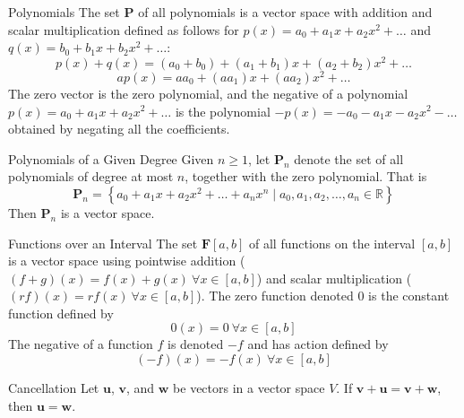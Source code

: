 \documentclass[12pt]{article}
\begin{document}
\begin{definition}{Polynomials}{}
    The set $ \mathbf{P} $ of all polynomials is a vector space with addition and scalar multiplication defined as follows for $ p \left( x \right) = a_0 + a_1 x + a_2 x^2 + \dots $ and $ q \left( x \right) = b_0 + b_1 x + b_2 x^2 + \dots $:
    \[ p \left( x \right) + q \left( x \right) = \left( a_0 + b_0 \right) + \left( a_1 + b_1 \right) x + \left( a_2 + b_2 \right) x^2 + \dots \]
    \[ a p(x) = a a_0 + \left( a a_1 \right) x + \left( a a_2 \right) x^2 + \dots \]
    The zero vector is the zero polynomial, and the negative of a polynomial $ p \left( x \right) = a_0 + a_1 x + a_2 x^2 + \dots $ is the polynomial $ -p \left( x \right) = - a_0 - a_1 x - a_2 x^2 - \dots $ obtained by negating all the coefficients.
\end{definition}

\begin{definition}{Polynomials of a Given Degree}{}
    Given $ n \geq 1 $, let $ \mathbf{P}_n $ denote the set of all polynomials of degree at most $ n $, together with the zero polynomial. That is
    \[ \mathbf{P}_n = \left\{ a_0 + a_1 x + a_2 x^2 + \dots + a_n x^n \mid a_0, a_1, a_2, \dots, a_n \in \mathbb{R} \right\} \]
    Then $ \mathbf{P}_n $ is a vector space.
\end{definition}

\begin{definition}{Functions over an Interval}{}
    The set $ \mathbf{F} \left[ a , b \right] $ of all functions on the interval $ \left[ a, b \right] $ is a vector space using pointwise addition ($ \left( f + g \right) \left( x \right) = f \left( x \right) + g \left( x \right) \ \forall x \in \left[ a, b \right] $) and scalar multiplication ($ \left( rf \right) \left( x \right) = r f \left( x \right) \ \forall x \in \left[ a, b \right] $). The zero function denoted $ 0 $ is the constant function defined by
    \[ 0 \left( x \right) = 0 \ \forall x \in \left[ a, b \right] \]
    The negative of a function $ f $ is denoted $ -f $ and has action defined by
    \[ \left( -f \right) \left( x \right) = - f \left( x \right) \ \forall x \in \left[ a, b \right] \]
\end{definition}

\begin{theorem}{Cancellation}{}
    Let $ \mathbf{u} $, $ \mathbf{v} $, and $ \mathbf{w} $ be vectors in a vector space $ V $. If $ \mathbf{v} + \mathbf{u} = \mathbf{v} + \mathbf{w} $, then $ \mathbf{u} = \mathbf{w} $.
\end{theorem}
\end{document}
